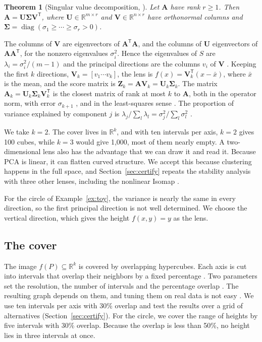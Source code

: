 \documentclass{article}
\newcommand{\R}{\mathbb{R}}
\newtheorem{theorem}{Theorem}[section]
\theoremstyle{definition}
\theoremstyle{remark}
\begin{document}
\begin{theorem}[Singular value decomposition, {\cite{axler2024ladr}}]
Let $\mathbf A$ have rank $r \ge 1$. Then $\mathbf A = \mathbf U \boldsymbol\Sigma \mathbf V^{\mathsf T}$, where $\mathbf U \in \R^{m \times r}$ and $\mathbf V \in \R^{n \times r}$ have orthonormal columns and $\boldsymbol\Sigma = \operatorname{diag}(\sigma_1 \ge \cdots \ge \sigma_r > 0)$.
\end{theorem}
The columns of $\mathbf V$ are eigenvectors of $\mathbf A^{\mathsf T}\mathbf A$, and the columns of $\mathbf U$ eigenvectors of $\mathbf A\mathbf A^{\mathsf T}$, for the nonzero eigenvalues $\sigma_i^2$. Hence the eigenvalues of $S$ are $\lambda_i = \sigma_i^2/(m-1)$ and the principal directions are the columns $v_i$ of $\mathbf V$ \parencite{jolliffecadima2016}.
Keeping the first $k$ directions, $\mathbf V_k = [v_1 \cdots v_k]$, the lens is $f(x) = \mathbf V_k^{\mathsf T} (x - \bar x)$, where $\bar x$ is the mean, and the score matrix is $\mathbf Z_k = \mathbf A \mathbf V_k = \mathbf U_k \boldsymbol\Sigma_k$.
The matrix $\mathbf A_k = \mathbf U_k \boldsymbol\Sigma_k \mathbf V_k^{\mathsf T}$ is the closest matrix of rank at most $k$ to $\mathbf A$, both in the operator norm, with error $\sigma_{k+1}$ \parencite{axler2024ladr}, and in the least-squares sense \parencite{jolliffecadima2016}.
The proportion of variance explained by component $j$ is $\lambda_j / \sum_l \lambda_l = \sigma_j^2 / \sum_l \sigma_l^2$ \parencite{jolliffecadima2016}.

We take $k = 2$.
The cover lives in $\R^k$, and with ten intervals per axis, $k = 2$ gives 100 cubes, while $k = 3$ would give 1{,}000, most of them nearly empty. A two-dimensional lens also has the advantage that we can draw it and read it.
Because PCA is linear, it can flatten curved structure. We accept this because clustering happens in the full space, and Section~\ref{sec:certify} repeats the stability analysis with three other lenses, including the nonlinear Isomap \parencite{tenenbaum2000isomap}.

For the circle of Example~\ref{ex:toy}, the variance is nearly the same in every direction, so the first principal direction is not well determined.
We choose the vertical direction, which gives the height $f(x,y) = y$ as the lens.

\subsection{The cover}
The image $f(P) \subseteq \R^k$ is covered by overlapping hypercubes. Each axis is cut into intervals that overlap their neighbors by a fixed percentage \parencite{singh2007mapper,madukpe2026review}.
Two parameters set the resolution, the number of intervals and the percentage overlap \parencite{singh2007mapper}. The resulting graph depends on them, and tuning them on real data is not easy \parencite{carrieremicheloudot2018}.
We use ten intervals per axis with 30\% overlap and test the results over a grid of alternatives (Section~\ref{sec:certify}).
For the circle, we cover the range of heights by five intervals with 30\% overlap. Because the overlap is less than 50\%, no height lies in three intervals at once.
\end{document}

